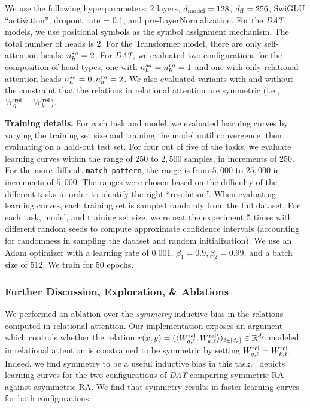 We use the following hyperparameters: 2 layers, $d_{\mathrm{model}} = 128$, $d_{\mathrm{ff}} = 256$, SwiGLU ``activation'', dropout rate = 0.1, and pre-LayerNormalization. For the \textit{DAT} models, we use positional symbols as the symbol assignment mechanism. The total number of heads is 2. For the Transformer model, there are only self-attention heads: $n_h^{sa} = 2$. For \textit{DAT}, we evaluated two configurations for the composition of head types, one with $n_h^{sa} = n_h^{ra} = 1$ and one with only relational attention heads $n_h^{sa} = 0, n_h^{ra} = 2$. We also evaluated variants with and without the constraint that the relations in relational attention are symmetric (i.e., $W_q^{\mathrm{rel}} = W_k^{\mathrm{rel}}$).

\textbf{Training details.} For each task and model, we evaluated learning curves by varying the training set size and training the model until convergence, then evaluating on a hold-out test set. For four out of five of the tasks, we evaluate learning curves within the range of $250$ to $2,500$ samples, in increments of $250$. For the more difficult \texttt{match pattern}, the range is from $5,000$ to $25,000$ in increments of $5,000$. The ranges were chosen based on the difficulty of the different tasks in order to identify the right ``resolution''. When evaluating learning curves, each training set is sampled randomly from the full dataset. For each task, model, and training set size, we repeat the experiment 5 times with different random seeds to compute approximate confidence intervals (accounting for randomness in sampling the dataset and random initialization). We use an Adam optimizer with a learning rate of $0.001$, $\beta_1 = 0.9, \beta_2 = 0.99$, and a batch size of $512$. We train for 50 epochs.

\subsubsection*{Further Discussion, Exploration, \& Ablations}

We performed an ablation over the \textit{symmetry} inductive bias in the relations computed in relational attention. Our implementation exposes an argument which controls whether the relation $r(x, y) = (\langle W_{q, \ell}^{\mathrm{rel}}, W_{k, \ell}^{\mathrm{rel}} \rangle)_{\ell \in [d_r]} \in \mathbb{R}^{d_r}$ modeled in relational attention is constrained to be symmetric by setting $W_{q, \ell}^{\mathrm{rel}} = W_{k, \ell}^{\mathrm{rel}}$. Indeed, we find symmetry to be a useful inductive bias in this task.~ depicts learning curves for the two configurations of \textit{DAT} comparing symmetric RA against asymmetric RA. We find that symmetry results in faster learning curves for both configurations.

